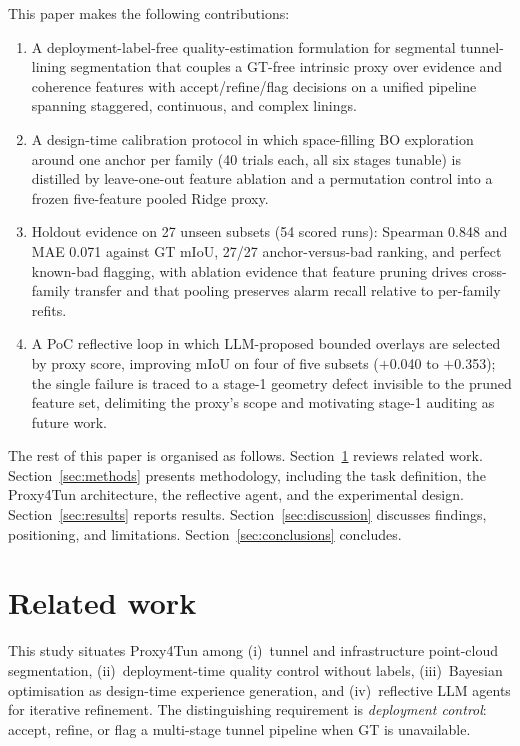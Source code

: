 \documentclass[a4paper,fleqn]{cas-dc}
\begin{document}
This paper makes the following contributions:
\begin{enumerate}
\item A deployment-label-free quality-estimation formulation for segmental tunnel-lining segmentation that couples a GT-free intrinsic proxy over evidence and coherence features with accept/refine/flag decisions on a unified pipeline spanning staggered, continuous, and complex linings.
\item A design-time calibration protocol in which space-filling BO exploration around one anchor per family (40 trials each, all six stages tunable) is distilled by leave-one-out feature ablation and a permutation control into a frozen five-feature pooled Ridge proxy.
\item Holdout evidence on 27 unseen subsets (54 scored runs): Spearman 0.848 and MAE 0.071 against GT mIoU, 27/27 anchor-versus-bad ranking, and perfect known-bad flagging, with ablation evidence that feature pruning drives cross-family transfer and that pooling preserves alarm recall relative to per-family refits.
\item A PoC reflective loop in which LLM-proposed bounded overlays are selected by proxy score, improving mIoU on four of five subsets ($+$0.040 to $+$0.353); the single failure is traced to a stage-1 geometry defect invisible to the pruned feature set, delimiting the proxy's scope and motivating stage-1 auditing as future work.
\end{enumerate}

The rest of this paper is organised as follows. Section~\ref{sec:related} reviews related work. Section~\ref{sec:methods} presents methodology, including the task definition, the Proxy4Tun architecture, the reflective agent, and the experimental design. Section~\ref{sec:results} reports results. Section~\ref{sec:discussion} discusses findings, positioning, and limitations. Section~\ref{sec:conclusions} concludes.

\section{Related work}\label{sec:related}

This study situates Proxy4Tun among (i)~tunnel and infrastructure point-cloud segmentation, (ii)~deployment-time quality control without labels, (iii)~Bayesian optimisation as design-time experience generation, and (iv)~reflective LLM agents for iterative refinement. The distinguishing requirement is \emph{deployment control}: accept, refine, or flag a multi-stage tunnel pipeline when GT is unavailable.
\end{document}
